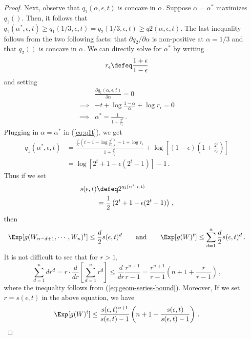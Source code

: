 \begin{proof}
Next, observe that $q_1(\alpha, \epsilon, t)$ is concave in $\alpha$. Suppose $\alpha = \alpha^*$ maximizes $q_1()$. Then, it follows that $q_1(\alpha^*, \epsilon, t) \geq q_1(1/3, \epsilon, t) = q_2(1/3, \epsilon, t) \geq q2(\alpha, \epsilon, t)$. The last inequality follows from the two following facts: that $\partial q_2/\partial \alpha$ is non-positive at $\alpha = 1/3$ and that $q_2()$ is concave in $\alpha$. We can directly solve for $\alpha^*$ by writing \[r_\epsilon \defeq \frac{1+\epsilon}{1-\epsilon}\] and setting
\begin{align*}
&\frac{\partial q_1(\alpha, \epsilon, t)}{\partial \alpha} = 0 \\
\implies& -t 
+ \log \frac{1-\alpha}{\alpha}
+ \log r_\epsilon
=0 \\
\implies& \alpha^* = \frac{1}{1+\frac{2^t}{r_\epsilon}}\, .
\end{align*}
Plugging in $\alpha = \alpha^*$ in (\ref{eq:q1t}), we get
\begin{align*}
q_1(\alpha^*, \epsilon, t)
&= \frac{ \frac{2^t}{r_\epsilon}(t - 1 - \log \frac{2^t}{r_\epsilon} ) - 1 + \log r_\epsilon }{1 + \frac{2^t}{r_\epsilon} }
+ \log \left[ (1-\epsilon) (1+\frac{2^t}{r_\epsilon})\right]\\
&= \log \left[2^t + 1 - \epsilon (2^t -1) \right] - 1\, .
\end{align*}
Thus if we set \begin{align*}
s(\epsilon, t) 
&\defeq 2^{q_1(\alpha^*, \epsilon, t)} \\
&= \frac{1}{2}\left( 2^t + 1 - \epsilon (2^t -1) \right)\, ,
\end{align*}
then
\[
\Exp[ g(W_{n-d+1}, \cdots, W_n)^t ] 
\leq
\frac{d}{2} s(\epsilon, t)^d
\qquad
\text{and}
\qquad
\Exp[ g(W)^t ] 
\leq 
\sum_{d=1}^n{\frac{d}{2} s(\epsilon, t)^d}\, .
\]
It is not difficult to see that for $r> 1$,
\[
\sum_{d=1}^n{d r^d} 
= r \cdot \frac{d}{d r} \left[ \sum_{d=1}^n{r^d}\right] 
\leq \frac{d}{d r} \frac{r^{n+1}}{r-1} 
= \frac{r^{n+1}}{r-1} \left( n + 1 + \frac{r}{r-1}\right) \, ,
\]
where the inequality follows from (\ref{eq:geom-series-bound}). Moreover, If we set $r = s(\epsilon, t)$ in the above equation, we have 
\[
\Exp[ g(W)^t ] 
\leq 
\frac{s(\epsilon, t)^{n+1}}{s(\epsilon, t)-1} \left( n + 1 + \frac{s(\epsilon, t)}{s(\epsilon, t)-1}\right)\, .
\]


\end{proof}
